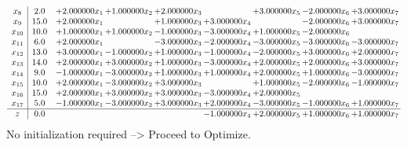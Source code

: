 \documentclass[10pt]{article}
\begin{document}
\[\begin{array}{c| c c@{\hskip 2pt} c@{\hskip 2pt} c@{\hskip 2pt} c@{\hskip 2pt} c@{\hskip 2pt} c@{\hskip 2pt} c@{\hskip 2pt} }
 x_{8}   &  2.0 & + 2.000000 x_{1} & + 1.000000 x_{2} & + 2.000000 x_{3} &   & + 3.000000 x_{5} & -2.000000 x_{6} & + 3.000000 x_{7}\\
 x_{9}   &  15.0 & + 2.000000 x_{1} &   & + 1.000000 x_{3} & + 3.000000 x_{4} &   & -2.000000 x_{6} & + 3.000000 x_{7}\\
 x_{10}   &  10.0 & + 1.000000 x_{1} & + 1.000000 x_{2} & -1.000000 x_{3} & -3.000000 x_{4} & + 1.000000 x_{5} & -2.000000 x_{6} &   \\
 x_{11}   &  6.0 & + 2.000000 x_{1} &   & -3.000000 x_{3} & -2.000000 x_{4} & -3.000000 x_{5} & -3.000000 x_{6} & -3.000000 x_{7}\\
 x_{12}   &  13.0 & + 3.000000 x_{1} & -1.000000 x_{2} & + 1.000000 x_{3} & -1.000000 x_{4} & -2.000000 x_{5} & + 3.000000 x_{6} & + 2.000000 x_{7}\\
 x_{13}   &  14.0 & + 2.000000 x_{1} & + 3.000000 x_{2} & + 1.000000 x_{3} & -3.000000 x_{4} & + 2.000000 x_{5} & + 2.000000 x_{6} & + 3.000000 x_{7}\\
 x_{14}   &  9.0 & -1.000000 x_{1} & -3.000000 x_{2} & + 1.000000 x_{3} & + 1.000000 x_{4} & + 2.000000 x_{5} & + 1.000000 x_{6} & -3.000000 x_{7}\\
 x_{15}   &  10.0 & + 2.000000 x_{1} & -3.000000 x_{2} & + 3.000000 x_{3} &   & + 1.000000 x_{5} & -2.000000 x_{6} & -1.000000 x_{7}\\
 x_{16}   &  15.0 & + 2.000000 x_{1} & + 3.000000 x_{2} & + 3.000000 x_{3} & -3.000000 x_{4} & + 2.000000 x_{5} &    &   \\
 x_{17}   &  5.0 & -1.000000 x_{1} & -3.000000 x_{2} & + 3.000000 x_{3} & + 2.000000 x_{4} & -3.000000 x_{5} & -1.000000 x_{6} & + 1.000000 x_{7}\\
\hline
z    &  0.0  &    &    &   & -1.000000 x_{4} & + 2.000000 x_{5} & + 1.000000 x_{6} & + 1.000000 x_{7}\\
\end{array}\]
No initialization required --> Proceed to Optimize. 
\end{document}
